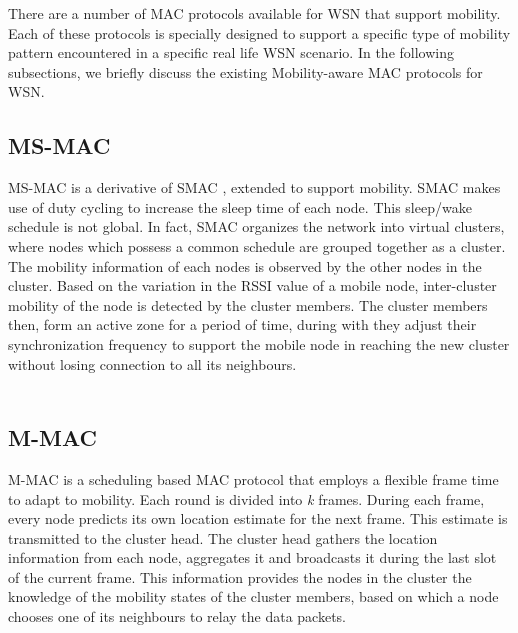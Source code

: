\documentclass[a4paper, conference, 10pt]{IEEEtran}
\begin{document}
There are a number of MAC protocols available for WSN that support mobility. Each of these protocols is specially designed to support a specific type of mobility pattern encountered in a specific real life WSN scenario. In the following subsections, we briefly discuss the existing Mobility-aware MAC protocols for WSN.\\

\subsection{MS-MAC}
 MS-MAC \cite{ms-mac} is a derivative of SMAC \cite{smac}, extended to support mobility. SMAC makes use of duty cycling to increase the sleep time of each node. This sleep/wake schedule is not global. In fact, SMAC organizes the network into virtual clusters, where nodes which possess a common schedule are grouped together as a cluster. The mobility information of each nodes is observed by the other nodes in the cluster. Based on the variation in the RSSI value of a mobile node, inter-cluster mobility of the node is detected by the cluster members. The cluster members then, form an active zone for a period of time, during with they adjust their synchronization frequency to support the mobile node in reaching the new cluster without losing connection to all its neighbours. \\\\

\subsection{M-MAC}
M-MAC \cite{m-mac} is a scheduling based MAC protocol that employs a flexible frame time to adapt to mobility. Each round is divided into \emph{k} frames. During each frame, every node predicts its own location estimate for the next frame. This estimate is transmitted to the cluster head. The cluster head gathers the location information from each node, aggregates it and broadcasts it during the last slot of the current frame. This information provides the nodes in the cluster the knowledge of the mobility states of the cluster members, based on which a node chooses one of its neighbours to relay the data packets.
\end{document}

